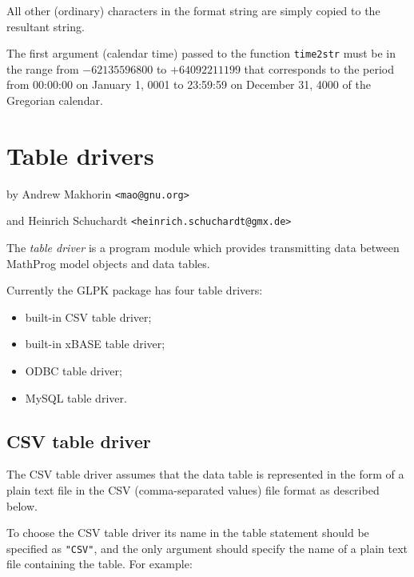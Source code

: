 \documentclass[10pt]{article}
\begin{document}
\medskip

All other (ordinary) characters in the format string are simply copied
to the resultant string.

The first argument (calendar time) passed to the function {\tt time2str}
must be in the range from $-62135596800$ to $+64092211199$ that
corresponds to the period from 00:00:00 on January 1, 0001 to 23:59:59
on December 31, 4000 of the Gregorian calendar.


\newpage

\section{Table drivers}
\label{drivers}

\noindent\hfil
by Andrew Makhorin \verb|<mao@gnu.org>|

\noindent\hfil
and Heinrich Schuchardt \verb|<heinrich.schuchardt@gmx.de>|

\bigskip\bigskip

The {\it table driver} is a program module which provides transmitting
data between MathProg model objects and data tables.

Currently the GLPK package has four table drivers:

\setlength{\leftmargini}{2.5em}

\begin{itemize}
\item built-in CSV table driver;
\item built-in xBASE table driver;
\item ODBC table driver;
\item MySQL table driver.
\end{itemize}

\subsection{CSV table driver}

The CSV table driver assumes that the data table is represented in the
form of a plain text file in the CSV (comma-separated values) file
format as described below.

To choose the CSV table driver its name in the table statement should
be specified as \verb|"CSV"|, and the only argument should specify the
name of a plain text file containing the table. For example:

\medskip
\end{document}
